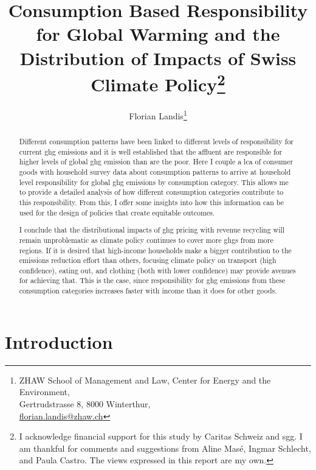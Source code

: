 \documentclass[a4paper,11pt,abstract=true]{scrartcl}
\author{Florian Landis\thanks{%
    ZHAW School of Management and Law, Center for Energy and the Environment, \\
    Gertrudstrasse 8, 8000 Winterthur, \\
    \href{mailto:florian.landis@zhaw.ch}{florian.landis@zhaw.ch}}
}
\title{Consumption Based Responsibility for Global Warming and the Distribution of Impacts of Swiss Climate Policy\thanks{%
  I acknowledge financial support for this study by Caritas Schweiz and \ac{sgg}.
  I am thankful for comments and suggestions from Aline Masé, Ingmar Schlecht, and Paula Castro.
  The views expressed in this report are my own.
}}
\date{}
\begin{document}
\maketitle
\begin{abstract}
  Different consumption patterns have been linked to different levels of responsibility for current \ac{ghg} emissions and it is well established that the affluent are responsible for higher levels of global \ac{ghg} emission than are the poor.
  Here I couple a \acl{lca} of consumer goods with household survey data about consumption patterns to arrive at household level responsibility for global \ac{ghg} emissions {by consumption category}.
  This allows me to provide a detailed analysis of how different consumption categories contribute to this responsibility.
  From this, I offer some insights into how this information can be used for the design of policies that create equitable outcomes.

  I conclude that the distributional impacts of \ac{ghg} pricing with revenue recycling will remain unproblematic as climate policy continues to cover more \ac{ghg}s from more regions.
  If it is desired that high-income households make a bigger contribution to the emissions reduction effort than others, focusing climate policy on transport (high confidence), eating out, and clothing (both with lower confidence) may provide avenues for achieving that.
  This is the case, since responsibility for \ac{ghg} emissions from these consumption categories increases faster with income than it does for other goods.
\end{abstract}

\section{Introduction}
\label{sec:intro}
\end{document}
